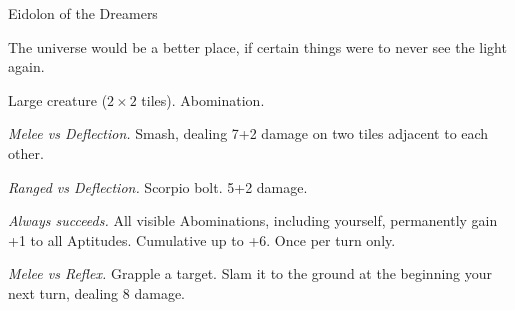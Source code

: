 \begin{monsterboxbg}{Eidolon of the Dreamers}

    The universe would be a better place, if certain things were to never see the light again.
    
    \rpghline
    \stats[
        STR = \stat{16}, 
        DEX = \stat{14},
        CON = \stat{22},
        INT = \stat{10},
        WIS = \stat{10},
        CHA = \stat{12},
    ]
    \rpghline

    \basics[
    armorclass = 0,
    hitpoints  = 200,
    focus      = 12,
    defenses   = {Deflection 1, Reflex 1, Fortitude 9, Will 2}
    ]
    \rpghline

    \details[%
    skills = {Athletics 2},
    accuracies = {Melee 4, Ranged 0},
    challenge = Boss,
    ]
    \rpghline%
    \begin{rpg-monsteraction}
        Large creature ($2 \times 2$ tiles). Abomination.
    \end{rpg-monsteraction}

    

    \begin{rpg-monsteraction}
        \textit{Melee vs Deflection.} Smash, dealing 7+2 damage on two tiles adjacent to each other.
    \end{rpg-monsteraction}

    \begin{rpg-monsteraction}
        \textit{Ranged vs Deflection.} Scorpio bolt. 5+2 damage.
    \end{rpg-monsteraction}

    \begin{rpg-monsteraction}
    \end{rpg-monsteraction}

    \begin{rpg-monsteraction}
        \textit{Always succeeds.} All visible Abominations, including yourself, permanently gain +1 to all Aptitudes. Cumulative up to +6. Once per turn only.
    \end{rpg-monsteraction}

    \begin{rpg-monsteraction}
        \textit{Melee vs Reflex.} Grapple a target. Slam it to the ground at the beginning your next turn, dealing 8 damage.
    \end{rpg-monsteraction}


\end{monsterboxbg}
